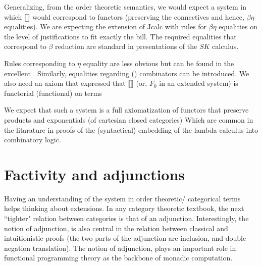 Generalizing, from the order theoretic semantics, we would expect a system
in which $\llbracket\rrbracket$ would correspond to functors 
(preserving the connectives and hence, $\beta\eta$ equalities). 
We are expecting the extension of Jcalc with rules for $\beta\eta$ equalities 
on the level of justifications to fit exactly the bill. The required 
equalities that correspond to $\beta$ reduction are standard in presentations of 
the $SK$ calculus. 
\begin{mdframed}
    \end{mdframed}
Rules corresponding to $\eta$ equality are less obvious 
but can be found in the excellent \cite{}. Similarly, equalities regarding (\wedge)
combinators can be introduced. 
We also need an axiom  that expressed 
that $\llbracket\rrbracket$ (or, $F_0$ in an extended system) is functorial (functional)
on terms
\begin{mdframed}
    \begin{mathpar}
    \end{mathpar}
\end{mdframed}
We expect that such a system is a full axiomatization  of functors
that preserve products and exponentials (of cartesian closed categories) 
Which are common in the litarature in proofs of the (syntactical) 
embedding of the lambda calculus into combinatory logic.



\section {Factivity and adjunctions}
Having an understanding of the system in order theoretic/ categorical terms 
helps thinking about extensions. In any category theoretic
textbook, the next ``tighter" relation between categories is that of an adjunction.
Interestingly, the notion of adjunction, is also central in the relation
between classical and intuitionistic proofs (the two parts of the adjunction
are inclusion, and double negation translation).  The notion of adjunction, plays
an important role in functional programming theory as the backbone 
of monadic computation. 

